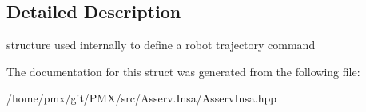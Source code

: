 \subsection{Detailed Description}
structure used internally to define a robot trajectory command 

The documentation for this struct was generated from the following file\+:\begin{DoxyCompactItemize}
\item 
/home/pmx/git/\+P\+M\+X/src/\+Asserv.\+Insa/Asserv\+Insa.\+hpp\end{DoxyCompactItemize}
